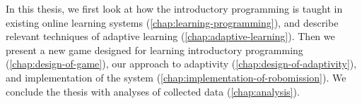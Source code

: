 In this thesis, we first look at how the introductory programming is taught
in existing online learning systems
(\cref{chap:learning-programming}),
and describe relevant techniques of adaptive learning
(\cref{chap:adaptive-learning}).
Then we present a new game designed for learning introductory programming
(\cref{chap:design-of-game}),
our approach to adaptivity (\cref{chap:design-of-adaptivity}),
and implementation of the system (\cref{chap:implementation-of-robomission}).
We conclude the thesis with analyses of collected data
(\cref{chap:analysis}).
